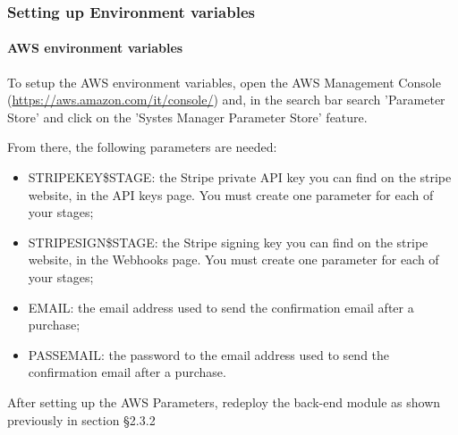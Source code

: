 \subsubsection{Setting up Environment variables}

\paragraph{AWS environment variables}
To setup the AWS environment variables, open the AWS Management Console (\url{https://aws.amazon.com/it/console/}) and, in the search bar search 'Parameter Store' and click on the 'Systes Manager Parameter Store' feature.

From there, the following parameters are needed:

\begin{itemize}
\item STRIPE\textunderscore KEY\textunderscore \$STAGE: the Stripe private API key you can find on the stripe website, in the API keys page. You must create one parameter for each of your stages;
\item STRIPE\textunderscore SIGN\textunderscore \$STAGE: the Stripe signing key you can find on the stripe website, in the Webhooks page. You must create one parameter for each of your stages;
\item EMAIL: the email address used to send the confirmation email after a purchase;
\item PASS\textunderscore EMAIL: the password to the email address used to send the confirmation email after a purchase.
\end{itemize}
 
After setting up the AWS Parameters, redeploy the back-end module as shown previously in section §2.3.2

